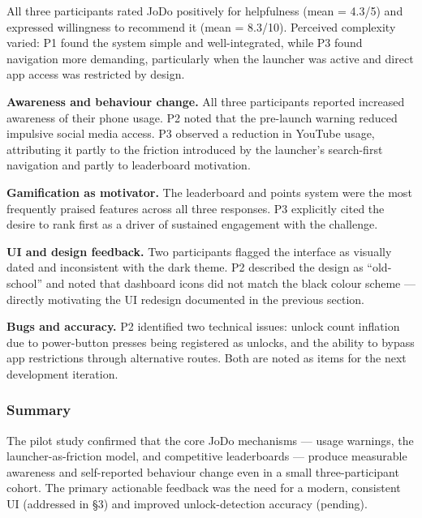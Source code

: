\documentclass[12pt]{article}
\begin{document}
\noindent All three participants rated JoDo positively for helpfulness (mean = 4.3/5) and expressed willingness to recommend it (mean = 8.3/10). Perceived complexity varied: P1 found the system simple and well-integrated, while P3 found navigation more demanding, particularly when the launcher was active and direct app access was restricted by design.


\noindent\textbf{Awareness and behaviour change.} All three participants reported increased awareness of their phone usage. P2 noted that the pre-launch warning reduced impulsive social media access. P3 observed a reduction in YouTube usage, attributing it partly to the friction introduced by the launcher's search-first navigation and partly to leaderboard motivation.

\noindent\textbf{Gamification as motivator.} The leaderboard and points system were the most frequently praised features across all three responses. P3 explicitly cited the desire to rank first as a driver of sustained engagement with the challenge.

\noindent\textbf{UI and design feedback.} Two participants flagged the interface as visually dated and inconsistent with the dark theme. P2 described the design as ``old-school'' and noted that dashboard icons did not match the black colour scheme — directly motivating the UI redesign documented in the previous section.

\noindent\textbf{Bugs and accuracy.} P2 identified two technical issues: unlock count inflation due to power-button presses being registered as unlocks, and the ability to bypass app restrictions through alternative routes. Both are noted as items for the next development iteration.

\subsubsection{Summary}

The pilot study confirmed that the core JoDo mechanisms — usage warnings, the launcher-as-friction model, and competitive leaderboards — produce measurable awareness and self-reported behaviour change even in a small three-participant cohort. The primary actionable feedback was the need for a modern, consistent UI (addressed in \S3) and improved unlock-detection accuracy (pending).
\

\clearpage


\end{document}
